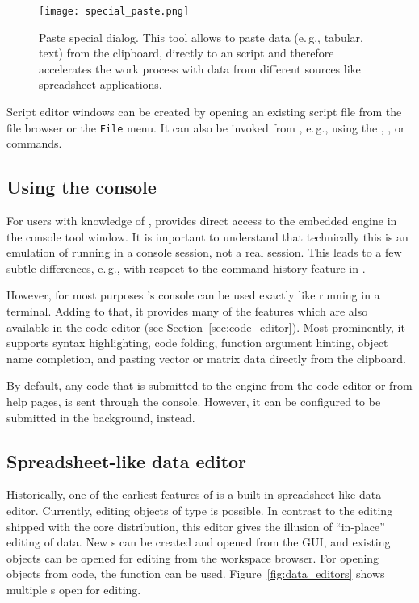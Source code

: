 \begin{figure}[t!]
 \centering
 \texttt{[image: special\_paste.png]}
 \caption{Paste special dialog. This tool allows to paste data (e.\,g., tabular, text) from the clipboard, directly to an 
  script and therefore accelerates the work process with data from different sources 
 like spreadsheet applications.
}
 \label{fig:special_paste}
\end{figure}

Script editor windows can be created by opening an existing
 script file from the file browser or the
\texttt{File} menu. It can
also be invoked from , e.\,g., using the
, , or 
commands.

\subsection[Using the R console]{Using the  console}
\label{sec:using_R_console}
For users with knowledge of ,  provides direct access to the
embedded  engine in the
 console tool window. It is important to understand that technically this is an
emulation of  running in a console
session, not a real  session. This leads to a few subtle
differences, e.\,g., with respect to the command history feature in
.

However, for most purposes 's  console can be used exactly
like  running in a terminal. Adding to that, it provides many of the
features which are also available in the code editor (see Section~\ref{sec:code_editor}).
Most prominently, it supports syntax highlighting, code
folding, function argument hinting, object name completion, and pasting
vector or matrix data directly from the clipboard.

By default, any code that is submitted to the
 engine from the code editor or from help
pages, is sent through the  console.
However, it can be configured to be submitted in the background,
instead.


\subsection{Spreadsheet-like data editor}
\label{sec:spreadsheet}

Historically, one of the earliest
features of  is a built-in spreadsheet-like data editor.
Currently, editing  objects of type
 is possible. In contrast to the  editing shipped
with the  core distribution, this editor
gives the illusion of ``in-place'' editing of data. New s can
be created and opened from the GUI, and existing objects can be opened
for editing from the workspace browser. For opening objects from
 code, the function  can be used.
Figure~\ref{fig:data_editors} shows multiple s open for editing.

